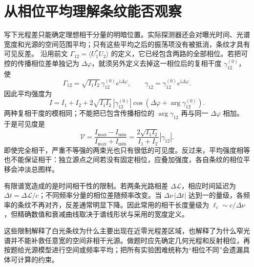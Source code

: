 \section{从相位平均理解条纹能否观察}
写下光程差只能确定理想相干分量的明暗位置。实际探测器还会对曝光时间、光谱宽度和光源的空间范围平均；只有这些平均之后的振荡项没有被抵消，条纹才具有可见反差。
沿用前文 $\Gamma_{12}=\langle U_1^*U_2\rangle$ 的定义，它已经包含两路的全部相位。若把可控的传播相位差单独记为 $\Delta\varphi$，就须另外定义去掉这一相位后的复相干度 $\gamma_{12}^{(0)}$，使
\[
 \Gamma_{12}=\sqrt{I_1I_2}\,\gamma_{12}^{(0)}e^{\mathrm i\Delta\varphi},\qquad
 \gamma_{12}=\gamma_{12}^{(0)}e^{\mathrm i\Delta\varphi}.
\]
因此平均强度为
\[
 I=I_1+I_2+2\sqrt{I_1I_2}\,|\gamma_{12}^{(0)}|
 \cos\!\left(\Delta\varphi+\arg\gamma_{12}^{(0)}\right).
\]
两种复相干度的模相同；不能把已包含传播相位的 $\arg\gamma_{12}$ 再与同一 $\Delta\varphi$ 相加。
于是可见度是
\[
 \mathcal V=\frac{I_{\max}-I_{\min}}{I_{\max}+I_{\min}}
 =\frac{2\sqrt{I_1I_2}}{I_1+I_2}|\gamma_{12}|.
\]
即使完全相干，严重不等强的两束光也只有很低的可见度。反过来，平均强度相等也不能保证相干：独立源点之间若没有固定相位，应叠加强度，各自条纹的相位平移会冲淡总图样。

有限谱宽造成的是时间相干性的限制。若两条光路相差 $\Delta\mathcal L$，相应时间延迟为 $\Delta t=\Delta\mathcal L/c$；不同频率分量的相位差随频率改变。当 $\Delta\nu\,|\Delta t|$ 达到一的量级，各频率的条纹不再对齐，反差通常明显下降。因此常用的相干长度量级为 $\ell_c\sim c/\Delta\nu$，但精确数值和衰减曲线取决于谱线形状与采用的宽度定义。

这些限制解释了白光条纹为什么主要出现在近零光程差区域，也解释了为什么窄光谱并不能补救任意宽的空间非相干光源。做题时应先确定几何光程和反射相位，再按题给光源模型进行空间或频率平均；把所有实验困难统称为“相位不同”会遗漏具体可计算的约束。
